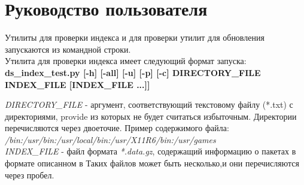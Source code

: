 \section{Руководство пользователя}
Утилиты для проверки индекса и для проверки утилит для обновления
запускаются из командной строки. \\
Утилита для проверки индекса имеет следующий формат запуска: \\
\textbf{ds\_index\_test.py [-h] [-all] [-u] [-p] [-c] DIRECTORY\_FILE INDEX\_FILE [INDEX\_FILE ...]]}

\emph{DIRECTORY\_FILE} - аргумент, соответствующий текстовому файлу (*.txt) с 
директориями, provide из которых не будет считаться избыточным. Директории
перечисляются  через двоеточие. Пример содержимого файла:
\textit{/bin:/usr/bin:/usr/local/bin:/usr/X11R6/bin:/usr/games}\\

\emph{INDEX\_FILE }- файл формата \textit{*.data.gz}, содержащий информацию о пакетах
в формате описанном в %
 Таких файлов может быть несколько,и они перечисляются через пробел.\\

